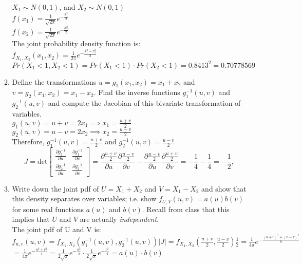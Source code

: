 \documentclass[11pt]{article}
\begin{document}
\begin{enumerate}[label=\textbf{Question \arabic*:},start=1]
\begin{enumerate}
  $X_1 \sim N(0, 1)$, and $X_2 \sim N(0, 1)$\\
  $f(x_1) = \frac{1}{\sqrt{2 \pi}} e^{-\frac{x_1^2}{2}} $ \\
  $f(x_2) = \frac{1}{\sqrt{2 \pi}} e^{-\frac{x_2^2}{2}}  $ \\
  The joint probability density function is: \\
  $f_{X_1, X_2}(x_1, x_2) = \frac{1}{2 \pi} e^{-\frac{x_1^2 + x_2^2}{2}}$\\
  
  $Pr(X_1 < 1, X_2 < 1) = Pr(X_1 < 1) \cdot Pr(X_2 < 1) = 0.8413^2 = 0.70778569 $\\
  

  \item Define the transformations $u = g_1(x_1,x_2) = x_1 + x_2$ and $v = g_2(x_1,x_2) = x_1 - x_2$. Find the inverse functions $g_1^{-1}(u,v)$ and $g_2^{-1}(u,v)$ and compute the Jacobian of this bivariate transformation of variables.\\
  
  $g_1(u, v) = u + v = 2 x_1 \implies x_1 = \frac{u+v}{2} $\\
  $g_2(u, v) = u - v = 2 x_2 \implies x_2 = \frac{u-v}{2} $\\
  
  Therefore, $g_1^{-1}(u,v) =\frac{u+v}{2} $ and $g_2^{-1}(u,v) = \frac{u-v}{2}$\\
  
  \[
J = \text{det}
\begin{bmatrix}
	\frac {\partial g_1^{-1}}{\partial u}	& \frac {\partial g_1^{-1}}{\partial v} \\
	\frac {\partial g_2^{-1}}{\partial u}	& \frac {\partial g_2^{-1}}{\partial v}
\end{bmatrix}
= \frac {\partial \frac{u+v}{2}}{\partial u} \frac {\partial \frac{u-v}{2}}{\partial v} - \frac {\partial \frac{u-v}{2}}{\partial u} \frac {\partial \frac{u+v}{2}}{\partial v} = -\frac{1}{4} -\frac{1}{4} = -\frac{1}{2},
\]

  \item Write down the joint pdf of $U = X_1 + X_2$ and $V = X_1 - X_2$ and show that this density separates over variables; i.e. show $f_{U,V}(u,v) = a(u)b(v)$ for some real functions $a(u)$ and $b(v)$. Recall from class that this implies that $U$ and $V$ are actually {\em independent}. \\
  
  The joint pdf of U and V is:\\
  $f_{u,v}(u,v) = f_{X_1,X_2}\left( g_1^{-1}(u,v), g_2^{-1}(u,v)\right) |J| = f_{X_1,X_2}\left( \frac{u+v}{2}, \frac{u-v}{2}\right) \frac{1}{2} = \frac{1}{4 \pi} e^{-\frac{(u+v)^2 + (u-v)^2}{8}}$ \\
  $= \frac{1}{4 \pi} e^{-\frac{u^2 + v^2}{4}} = \frac{1}{2\sqrt{\pi}} e^{-\frac{u^2}{4}} \cdot \frac{1}{2\sqrt{\pi}} e^{-\frac{v^2}{4}} = a(u) \cdot b(v) $\\
  

\end{enumerate}
\end{enumerate}
\end{document}
